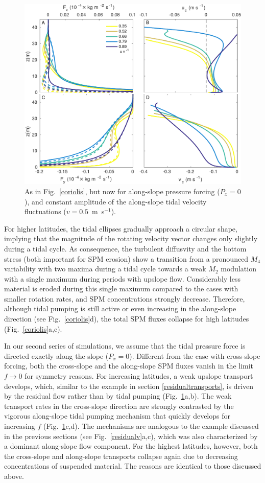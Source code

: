 \begin{figure}
  \noindent\includegraphics[width=30pc]{coriolis2.pdf}
  \caption{As in Fig.\ \ref{coriolis}, but now for along-slope
    pressure forcing ($P_x=0$), and constant amplitude of the
    along-slope tidal velocity fluctuations ($v=0.5$~m~s$^{-1}$).}
  \label{coriolis2}
\end{figure}

For higher latitudes, the tidal ellipses gradually approach a circular
shape, implying that the magnitude of the rotating velocity vector
changes only slightly during a tidal cycle. As consequence, the
turbulent diffusvity and the bottom stress (both important for SPM
erosion) show a transition from a pronounced $M_4$ variability with
two maxima during a tidal cycle towards a weak $M_2$ modulation with a
single maximum during periods with upslope flow. Considerably less
material is eroded during this single maximum compared to the cases
with smaller rotation rates, and SPM concentrations strongly
decrease. Therefore, although tidal pumping is still active or even
increasing in the along-slope direction (see Fig.\ \ref{coriolis}d),
the total SPM fluxes collapse for high latitudes
(Fig.\ \ref{coriolis}a,c).

In our second series of simulations, we assume that the tidal pressure
force is directed exactly along the slope ($P_x=0$). Different from
the case with cross-slope forcing, both the cross-slope and the
along-slope SPM fluxes vanish in the limit $f \rightarrow 0$ for
symmetry reasons. For increasing latitudes, a weak upslope transport
develops, which, similar to the example in section
\ref{residualtransports}, is driven by the residual flow rather than
by tidal pumping (Fig.\ \ref{coriolis2}a,b). The weak transport rates
in the cross-slope direction are strongly contrasted by the vigorous
along-slope tidal pumping mechanism that quickly develops for
increasing $f$ (Fig.\ \ref{coriolis2}c,d). The mechanisms are analogous
to the example discussed in the previous sections (see
Fig.\ \ref{residualv}a,c), which was also characterized by a dominant
along-slope flow component. For the highest latitudes, however, both
the cross-slope and along-slope transports collapse again due to
decreasing concentrations of suspended material. The reasons are
identical to those discussed above.